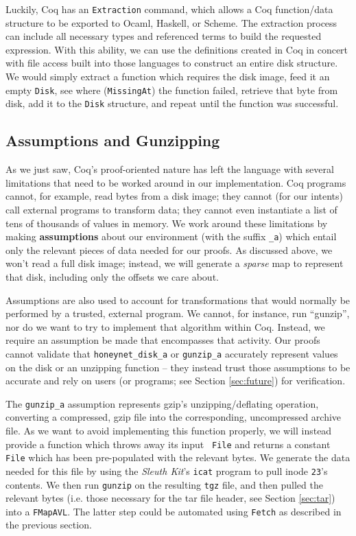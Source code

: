 \documentclass[nocopyrightspace]{sigplanconf}
\begin{document}
Luckily, Coq has an {\tt Extraction} command, which allows a Coq function/data
structure to be exported to Ocaml, Haskell, or Scheme. The extraction process
can include all necessary types and referenced terms to build the requested
expression. With this ability, we can use the definitions created in Coq in
concert with file access built into those languages to construct an entire
disk structure. We would simply extract a function which requires the disk
image, feed it an empty {\tt Disk}, see where ({\tt MissingAt}) the function
failed, retrieve that byte from disk, add it to the {\tt Disk} structure, and
repeat until the function was successful.

\subsection{Assumptions and Gunzipping}
\label{subsec:gunzip}

As we just saw, Coq's proof-oriented nature has left the language with several
limitations that need to be worked around in our implementation. Coq programs
cannot, for example, read bytes from a disk image; they cannot (for our
intents) call external programs to transform data; they cannot even
instantiate a list of tens of thousands of values in memory. We work around
these limitations by making {\bf assumptions} about our environment (with the
suffix {\tt \_a}) which entail only the relevant pieces of data needed for our
proofs. As discussed above, we won't read a full disk image; instead, we will
generate a {\it sparse} map to represent that disk, including only the offsets
we care about.

Assumptions are also used to account for transformations that would normally
be performed by a trusted, external program. We cannot, for instance, run
``gunzip'', nor do we want to try to implement that algorithm within Coq.
Instead, we require an assumption be made that encompasses that activity. Our
proofs cannot validate that {\tt honeynet\_disk\_a} or {\tt gunzip\_a}
accurately represent values on the disk or an unzipping function -- they
instead trust those assumptions to be accurate and rely on users (or programs;
see Section \ref{sec:future}) for verification.

The {\tt gunzip\_a} assumption represents gzip's unzipping/deflating
operation, converting a compressed, gzip file into the corresponding,
uncompressed archive file. As we want to avoid implementing this function
properly, we will instead provide a function which throws away its input {\tt
File} and returns a constant {\tt File} which has been pre-populated with the
relevant bytes. We generate the data needed for this file by using the {\it
Sleuth Kit}'s {\tt icat} program to pull inode {\tt 23}'s contents. We then
run {\tt gunzip} on the resulting {\tt tgz} file, and then pulled the relevant
bytes (i.e. those necessary for the tar file header, see Section
\ref{sec:tar}) into a {\tt FMapAVL}. The latter step could be automated using
{\tt Fetch} as described in the previous section.
\end{document}
